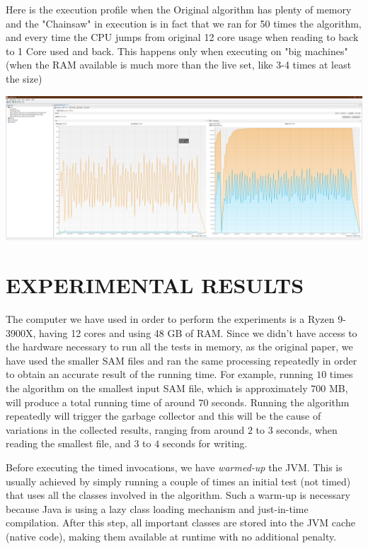 \documentclass[a4paper,twoside]{article}
\begin{document}
Here is the execution profile when the Original algorithm has plenty of memory and the "Chainsaw" in execution is in fact that we ran for 50 times the algorithm, and every time the CPU jumps from original 12 core usage when reading to back to 1 Core used and back. This happens only when executing on "big machines" (when the RAM available is much more than the live set, like 3-4 times at least the size)
\begin{center}
	\includegraphics[scale=0.065]{images/Visual_VM_Small_file_Original_execution_profile.png}
\end{center}


\section{\uppercase{Experimental Results}}

The computer we have used in order to perform the experiments is a Ryzen 9-3900X, having 12 cores and using 48 GB of RAM.
Since we didn't have access to the hardware necessary to run all the tests in memory, as the original paper, we have used the smaller SAM files and ran the same processing repeatedly in order to obtain an accurate result of the running time.
For example, running $10$ times the algorithm on the smallest input SAM file, which is approximately $700$ MB, will produce a total running time of around $70$ seconds. 
Running the algorithm repeatedly will trigger the garbage collector and this will be the cause of variations in the collected results, ranging from around $2$ to $3$ seconds, when reading the smallest file, and $3$ to $4$ seconds for writing.

Before executing the timed invocations, we have {\it warmed-up} the JVM. 
This is usually achieved by simply running a couple of times an initial test (not timed) that uses all the classes involved in the algorithm. Such a warm-up is necessary because Java is using a lazy class loading mechanism and just-in-time compilation. After this step, all important classes are stored into the JVM cache (native code), making them available at runtime with no additional penalty.
\end{document}
